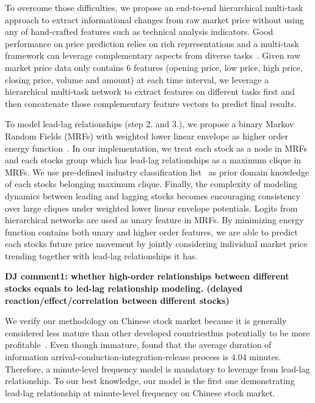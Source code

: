 \documentclass[sigconf, anonymous, review]{acmart}
\renewcommand{\citename}{\citet}
\renewcommand{\cite}{\citep}
\begin{document}
To overcome those difficulties, we propose an end-to-end
hierarchical multi-task~\cite{caruana1993multitask} approach to
extract informational changes from raw market price without using
any of hand-crafted features such as technical analysis
indicators. Good performance on price prediction relies on rich
representations and a multi-task framework can leverage
complementary aspects from diverse tasks~\cite{sogaard2016deep}.
Given raw market price data only contains 6 features (opening
price, low price, high price, closing price, volume and amount)
at each time interval, we leverage a hierarchical multi-task
network to extract features on different tasks first and then
concatenate those complementary feature vectors to predict final
results.

To model lead-lag relationships (step 2. and 3.), we propose a
binary Markov Random Fields (MRFs) with weighted lower linear
envelope as higher order energy
function~\cite{Kohli:CVPR07,Nowozin:2011,Gould:ICML2011,gouldlearning}.
In our implementation, we treat each stock as a node in MRFs and
each stocks group which has lead-lag relationships as a maximum
clique in MRFs. We use pre-defined industry classification
list~\cite{ths} as prior domain knowledge of each stock\textquotesingle s
belonging maximum clique. Finally, the complexity of modeling
dynamics between leading and lagging stocks becomes encouraging
consistency over large cliques under weighted lower linear
envelope potentials. Logits from hierarchical networks are used
as unary feature in MRFs. By minimizing energy function contains
both unary and higher order features, we are able to predict each
stock\textquotesingle s future price movement by jointly considering individual
market price trending together with lead-lag relationships it
has.

\textbf{DJ comment1: whether high-order relationships between different stocks equals to led-lag relationship modeling. (delayed reaction/effect/correlation between different stocks)}

We verify our methodology on Chinese stock market because
it is generally considered less mature than other developed
countries\textquotesingle thus potentially to be more
profitable~\cite{bessembinder1995profitability}. Even though
immature, \citename{fangyan2012} found that the average duration
of information arrival-conduction-integration-release process is
$4.04$ minutes. Therefore, a minute-level frequency model is
mandatory to leverage from lead-lag relationship. To our best
knowledge, our model is the first one demonstrating lead-lag
relationship at minute-level frequency on Chinese stock market.
\end{document}

